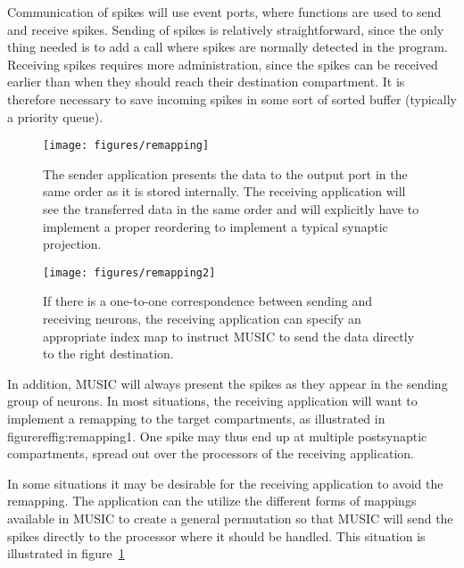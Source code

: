 \documentclass[a4paper]{report}
\begin{document}
Communication of spikes will use event ports, where functions are used
to send and receive spikes.  Sending of spikes is relatively
straightforward, since the only thing needed is to add a call where
spikes are normally detected in the program.  Receiving spikes
requires more administration, since the spikes can be received earlier
than when they should reach their destination compartment.  It is
therefore necessary to save incoming spikes in some sort of sorted
buffer (typically a priority queue).

\begin{figure}
  \begin{center}
    \begin{minipage}[t]{0.45\textwidth}
      \texttt{[image: figures/remapping]}
      \caption[Processing of incoming data]{\label{fig:remapping1}
        The sender application presents the data to the output port in
        the same order as it is stored internally.  The receiving
        application will see the transferred data in the same order
        and will explicitly have to implement a proper reordering to
        implement a typical synaptic projection.
      }
    \end{minipage}
    \hfill
    \begin{minipage}[t]{0.45\textwidth}
      \texttt{[image: figures/remapping2]}
      \caption[Remapping of data within MUSIC]{\label{fig:remapping2}
        If there is a one-to-one correspondence between sending and
        receiving neurons, the receiving application can specify an
        appropriate index map to instruct MUSIC to send the data
        directly to the right destination.
      }
    \end{minipage}
  \end{center}
\end{figure}

In addition, MUSIC will always present the spikes as they appear in
the sending group of neurons.  In most situations, the receiving
application will want to implement a remapping to the target
compartments, as illustrated in figureref{fig:remapping1}.  One spike
may thus end up at multiple postsynaptic compartments, spread out over
the processors of the receiving application.

In some situations it may be desirable for the receiving application
to avoid the remapping.  The application can the utilize the different
forms of mappings available in MUSIC to create a general permutation
so that MUSIC will send the spikes directly to the processor where it
should be handled.  This situation is illustrated in
figure~\ref{fig:remapping2}
\end{document}
